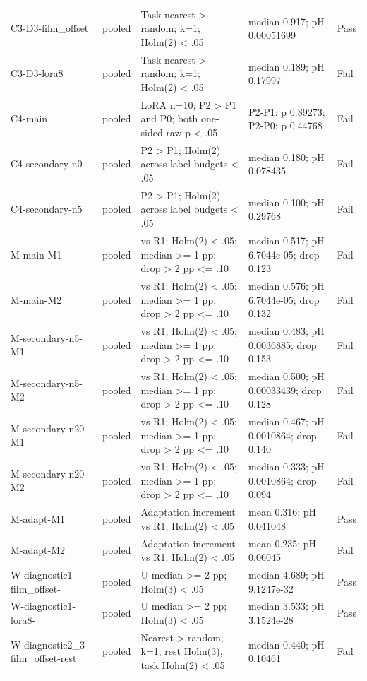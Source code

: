 \begin{longtable}{p{1.75in}p{.55in}p{2.15in}p{1.65in}p{.5in}}
C3-D3-film\_\allowbreak{}offset & pooled & Task nearest > random; k=1; Holm(2) < .05 & median 0.917; pH 0.00051699 & Pass \\
C3-D3-lora8 & pooled & Task nearest > random; k=1; Holm(2) < .05 & median 0.189; pH 0.17997 & Fail \\
C4-main & pooled & LoRA n=10; P2 > P1 and P0; both one-sided raw p < .05 & P2-P1: p 0.89273; P2-P0: p 0.44768 & Fail \\
C4-secondary-n0 & pooled & P2 > P1; Holm(2) across label budgets < .05 & median 0.180; pH 0.078435 & Fail \\
C4-secondary-n5 & pooled & P2 > P1; Holm(2) across label budgets < .05 & median 0.100; pH 0.29768 & Fail \\
M-main-M1 & pooled & vs R1; Holm(2) < .05; median >= 1 pp; drop > 2 pp <= .10 & median 0.517; pH 6.7044e-05; drop 0.123 & Fail \\
M-main-M2 & pooled & vs R1; Holm(2) < .05; median >= 1 pp; drop > 2 pp <= .10 & median 0.576; pH 6.7044e-05; drop 0.132 & Fail \\
M-secondary-n5-M1 & pooled & vs R1; Holm(2) < .05; median >= 1 pp; drop > 2 pp <= .10 & median 0.483; pH 0.0036885; drop 0.153 & Fail \\
M-secondary-n5-M2 & pooled & vs R1; Holm(2) < .05; median >= 1 pp; drop > 2 pp <= .10 & median 0.500; pH 0.00033439; drop 0.128 & Fail \\
M-secondary-n20-M1 & pooled & vs R1; Holm(2) < .05; median >= 1 pp; drop > 2 pp <= .10 & median 0.467; pH 0.0010864; drop 0.140 & Fail \\
M-secondary-n20-M2 & pooled & vs R1; Holm(2) < .05; median >= 1 pp; drop > 2 pp <= .10 & median 0.333; pH 0.0010864; drop 0.094 & Fail \\
M-adapt-M1 & pooled & Adaptation increment vs R1; Holm(2) < .05 & mean 0.316; pH 0.041048 & Pass \\
M-adapt-M2 & pooled & Adaptation increment vs R1; Holm(2) < .05 & mean 0.235; pH 0.06045 & Fail \\
W-diagnostic1-film\_\allowbreak{}offset- & pooled & U median >= 2 pp; Holm(3) < .05 & median 4.689; pH 9.1247e-32 & Pass \\
W-diagnostic1-lora8- & pooled & U median >= 2 pp; Holm(3) < .05 & median 3.533; pH 3.1524e-28 & Pass \\
W-diagnostic2\_\allowbreak{}3-film\_\allowbreak{}offset-rest & pooled & Nearest > random; k=1; rest Holm(3), task Holm(2) < .05 & median 0.440; pH 0.10461 & Fail \\

\end{longtable}
